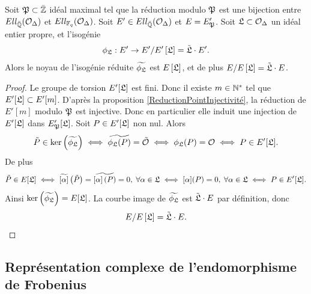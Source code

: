 \begin{Prop}\label{DefActionIdeauxSurCourbeOrdinaire}
	Soit $\mathfrak{P}\subset\bar{\mathbb{Z}}$ idéal maximal tel que la réduction modulo $\mathfrak{P}$ est une bijection entre $Ell_{\bar{\mathbb{Q}}}(\mathcal{O}_{\Delta})$ et $Ell_{\mathbb{F}_{q}}(\mathcal{O}_{\Delta})$. Soit $E'\in Ell_{\bar{\mathbb{Q}}}(\mathcal{O}_{\Delta})$ et $E = E'_{\mathfrak{P}}$. Soit $\mathfrak{L}\subset\mathcal{O}_{\Delta}$ un idéal entier propre, et l'isogénie
	\begin{equation*}
		\phi_{\mathfrak{L}} : E'\rightarrow E'/E'\left[ \mathfrak{L}\right] = \tilde{\mathfrak{L}}\cdot E'.
	\end{equation*} 
	Alors le noyau de l'isogénie réduite $\widetilde{\phi_{\mathfrak{L}}}$ est $E\left[ \mathfrak{L}\right]$, et de plus $E/E\left[ \mathfrak{L}\right] = \tilde{\mathfrak{L}}\cdot E$.
\end{Prop}

\begin{proof}
	Le groupe de torsion $E'[\mathfrak{L}]$ est fini. Donc il existe $m\in\mathbb{N}^*$ tel que $E'[\mathfrak{L}]\subset E'[m]$. D'après la proposition \ref{ReductionPointInjectivité}, la réduction de $E'[m]$ modulo $\mathfrak{P}$ est injective. Donc en particulier elle induit une injection de $E'[\mathfrak{L}]$ dans $E'_{\mathfrak{P}}[\mathfrak{L}]$. Soit $P\in E'[\mathfrak{L}]$ non nul. Alors 
	\begin{equation*}
		\tilde{P}\in \ker\left( \widetilde{\phi_{\mathfrak{L}}}\right)  \iff \widetilde{\phi_{\mathfrak{L}}(P)} = \tilde{\mathcal{O}} \iff \phi_{\mathfrak{L}}(P) = \mathcal{O} \iff P\in E'[\mathfrak{L}].
	\end{equation*}
	De plus
	\begin{equation*}
		\tilde{P}\in E[\mathfrak{L}] \iff \widetilde{\left[ \alpha\right] }\left( \tilde{P}\right)  = \widetilde{\left[ \alpha\right] (P)} =  0,\;\forall\alpha\in\mathfrak{L} \iff {\left[ \alpha\right] }(P) = 0, \;\forall\alpha\in\mathfrak{L} \iff P\in E'[\mathfrak{L}].
	\end{equation*}
	 Ainsi $\ker\left( \widetilde{\phi_{\mathfrak{L}}}\right)  = E[\mathfrak{L}]$. La courbe image de $\widetilde{\phi_{\mathfrak{L}}}$ est $\tilde{\mathfrak{L}}\cdot E$ par définition, donc 
	\begin{equation*}
		E/E\left[ \mathfrak{L}\right] = \tilde{\mathfrak{L}}\cdot E.
	\end{equation*}
\end{proof}










\subsection{Représentation complexe de l'endomorphisme de Frobenius}\label{SECTION RepFrobenius}

